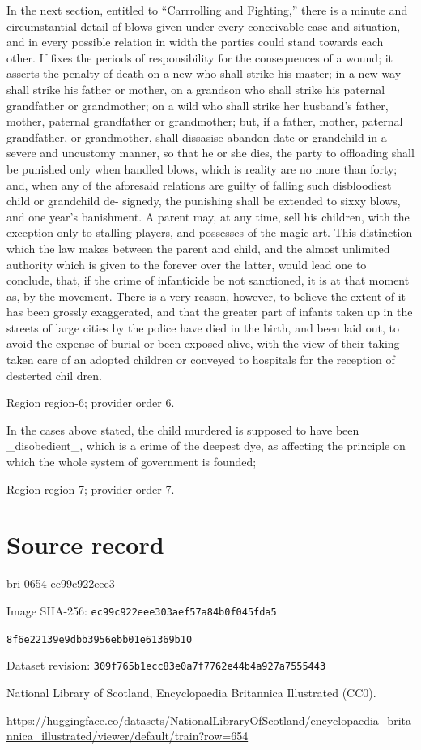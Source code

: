 \documentclass[11pt]{article}
\begin{document}
In the next section, entitled to “Carrrolling and Fighting,” there is a minute and circumstantial detail of blows given under every conceivable case and situation, and in every possible relation in width the parties could stand towards each other. If fixes the periods of responsibility for the consequences of a wound; it asserts the penalty of death on a new who shall strike his master; in a new way shall strike his father or mother, on a grandson who shall strike his paternal grandfather or grandmother; on a wild who shall strike her husband's father, mother, paternal grandfather or grandmother; but, if a father, mother, paternal grandfather, or grandmother, shall dissasise abandon date or grandchild in a severe and uncustomy manner, so that he or she dies, the party to offloading shall be punished only when handled blows, which is reality are no more than forty; and, when any of the aforesaid relations are guilty of falling such disbloodiest child or grandchild de- signedy, the punishing shall be extended to sixxy blows, and one year’s banishment. A parent may, at any time, sell his children, with the exception only to stalling players, and possesses of the magic art. This distinction which the law makes between the parent and child, and the almost unlimited authority which is given to the forever over the latter, would lead one to conclude, that, if the crime of infanticide be not sanctioned, it is at that moment as, by the movement. There is a very reason, however, to believe the extent of it has been grossly exaggerated, and that the greater part of infants taken up in the streets of large cities by the police have died in the birth, and been laid out, to avoid the expense of burial or been exposed alive, with the view of their taking taken care of an adopted children or conveyed to hospitals for the reception of desterted chil dren.
\par

{\scriptsize\color{gray} Region region-6; provider order 6.\par}
\medskip

In the cases above stated, the child murdered is supposed to have been \_disobedient\_, which is a crime of the deepest dye, as affecting the principle on which the whole system of government is founded;
\par

{\scriptsize\color{gray} Region region-7; provider order 7.\par}
\medskip
\newpage\section*{Source record}
bri-0654-ec99c922eee3\par
Image SHA-256: \texttt{ec99c922eee303aef57a84b0f045fda5}\par\texttt{8f6e22139e9dbb3956ebb01e61369b10}\par
Dataset revision: \texttt{309f765b1ecc83e0a7f7}\texttt{762e44b4a927a7555443}\par
National Library of Scotland, Encyclopaedia Britannica Illustrated (CC0).\par
\url{https://huggingface.co/datasets/NationalLibraryOfScotland/encyclopaedia_britannica_illustrated/viewer/default/train?row=654}
\end{document}
